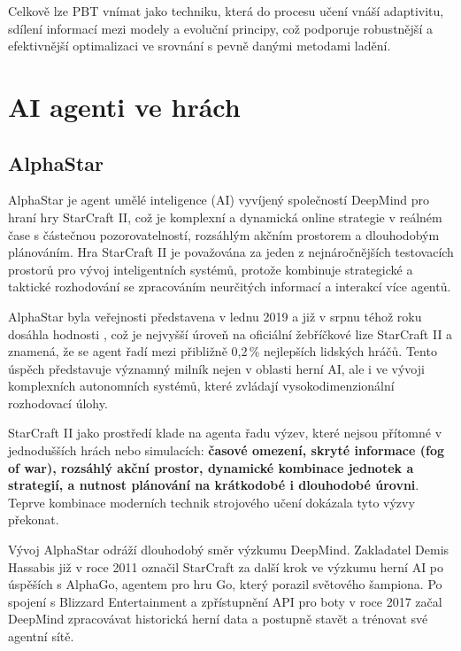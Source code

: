 Celkově lze PBT vnímat jako techniku, která do procesu učení vnáší adaptivitu, sdílení informací mezi modely a evoluční principy, což podporuje robustnější a efektivnější optimalizaci ve srovnání s pevně danými metodami ladění.

\newpage

\section{AI agenti ve hrách}
\subsection{AlphaStar}

AlphaStar\cite{Vinyalsbr} je agent umělé inteligence (AI) vyvíjený společností DeepMind pro hraní hry StarCraft II\cite{WikiSC}, což je komplexní a dynamická online strategie v reálném čase s částečnou pozorovatelností, rozsáhlým akčním prostorem a dlouhodobým plánováním. Hra StarCraft II je považována za jeden z nejnáročnějších testovacích prostorů pro vývoj inteligentních systémů, protože kombinuje strategické a taktické rozhodování se zpracováním neurčitých informací a interakcí více agentů.

AlphaStar byla veřejnosti představena v lednu 2019 a již v srpnu téhož roku dosáhla hodnosti , což je nejvyšší úroveň na oficiální žebříčkové lize StarCraft II a znamená, že se agent řadí mezi přibližně 0{,}2\,\% nejlepších lidských hráčů. Tento úspěch představuje významný milník nejen v oblasti herní AI, ale i ve vývoji komplexních autonomních systémů, které zvládají vysokodimenzionální rozhodovací úlohy.

StarCraft II jako prostředí klade na agenta řadu výzev, které nejsou přítomné v jednodušších hrách nebo simulacích: \textbf{časové omezení, skryté informace (fog of war), rozsáhlý akční prostor, dynamické kombinace jednotek a strategií, a nutnost plánování na krátkodobé i dlouhodobé úrovni}. Teprve kombinace moderních technik strojového učení dokázala tyto výzvy překonat.

Vývoj AlphaStar odráží dlouhodobý směr výzkumu DeepMind. Zakladatel Demis Hassabis již v roce 2011 označil StarCraft za další krok ve výzkumu herní AI po úspěších s AlphaGo, agentem pro hru Go, který porazil světového šampiona. Po spojení s Blizzard Entertainment a zpřístupnění API pro boty v roce 2017 začal DeepMind zpracovávat historická herní data a postupně stavět a trénovat své agentní sítě.

